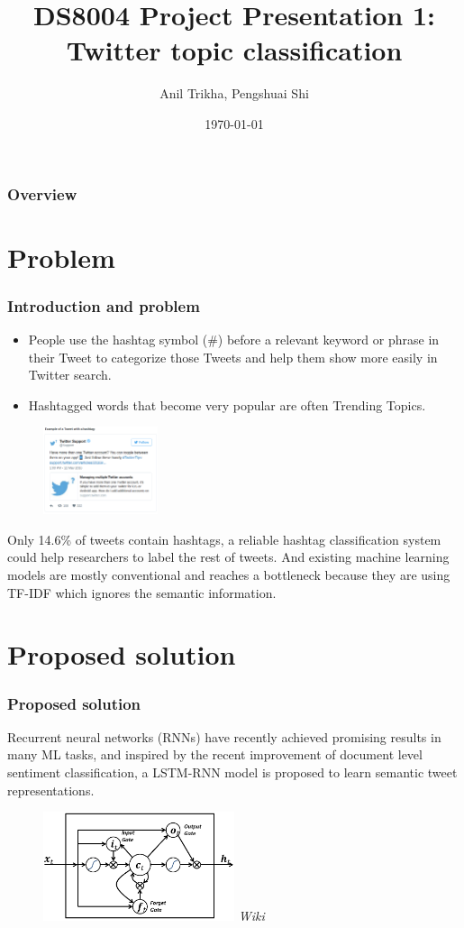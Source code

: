 \documentclass{beamer}
\title[DS8004 Project Presentation I]{DS8004 Project Presentation 1:\\ Twitter topic classification}
\author{Anil Trikha, Pengshuai Shi}
\institute[Ryerson]
{
Ryerson University \\
\medskip
}
\date{\today}
\begin{document}
\begin{frame}
\titlepage
\end{frame}

\begin{frame}
\frametitle{Overview}
\tableofcontents
\end{frame}

\section{Problem} 
\begin{frame}
\frametitle{Introduction and problem}
\begin{itemize}
\item People use the hashtag symbol (\#) before a relevant keyword or phrase in their Tweet to categorize those Tweets and help them show more easily in Twitter search.
\item Hashtagged words that become very popular are often Trending Topics.\cite{twitter_sup} 
\end{itemize}
\begin{figure}[h]
	\centering
	\includegraphics[width=0.3\textwidth]{twitter_hashtag.png}
\end{figure}
Only 14.6\% of tweets contain hashtags, a reliable hashtag classification system could help researchers to label the rest of tweets. And existing machine learning models are mostly conventional and reaches a bottleneck because they are using TF-IDF which ignores the semantic information.\cite{paper}  
\end{frame}
\section{Proposed solution}
\begin{frame}
\frametitle{Proposed solution}
Recurrent neural networks (RNNs) have recently achieved promising results in many ML tasks, and inspired by the recent improvement of document level sentiment classification, a LSTM-RNN model is proposed to learn semantic tweet representations. \cite{paper}
\begin{figure}[h]
\includegraphics[width=0.5\textwidth]{lstm.png}
\cite{lstm} \textit{Wiki}
\end{figure}
\end{frame}
\end{document}
